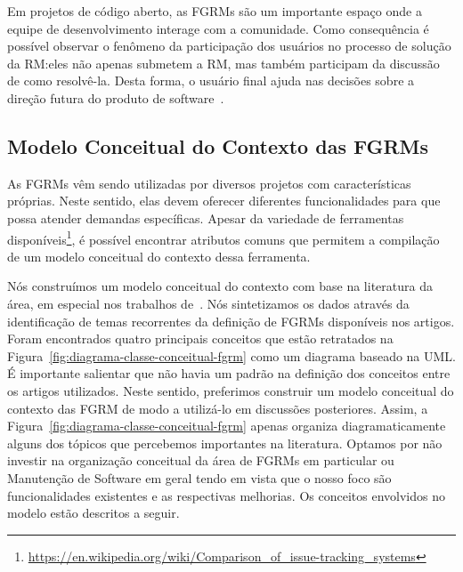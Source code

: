 Em projetos de código aberto, as FGRMs são um importante espaço onde a equipe de
desenvolvimento interage com a comunidade. Como consequência é possível observar
o fenômeno da participação dos usuários no processo de solução da RM:\@ eles não
apenas submetem a RM, mas também participam da discussão de como resolvê-la.
Desta forma, o usuário final ajuda nas decisões sobre a direção futura do
produto de software~\cite{breu2010information}.

\subsection{Modelo Conceitual do Contexto das FGRMs}
\label{sub:espectro_funcionalidades_fgrm}

As FGRMs vêm sendo utilizadas por diversos projetos com características
próprias. Neste sentido, elas devem oferecer diferentes funcionalidades para que
possa atender demandas específicas. Apesar da variedade de ferramentas
disponíveis\footnote{\url{https://en.wikipedia.org/wiki/Comparison_of_issue-tracking_systems}},
é possível encontrar atributos comuns que permitem a compilação de um modelo
conceitual do contexto dessa ferramenta.

Nós construímos um modelo conceitual do contexto com base na literatura da área,
em especial nos trabalhos de~\cite{cavalcanti2014challenges, singh2011bug,
    kshirsagar2015issue}. Nós sintetizamos os dados através da identificação de
temas recorrentes da definição de FGRMs disponíveis nos artigos. Foram
encontrados quatro principais conceitos que estão retratados na
Figura~\ref{fig:diagrama-classe-conceitual-fgrm} como um diagrama baseado na
UML\@. É importante salientar que não havia um padrão na definição dos conceitos
entre os artigos utilizados. Neste sentido, preferimos construir um modelo
conceitual do contexto das FGRM de modo a utilizá-lo em discussões posteriores.
Assim, a Figura~\ref{fig:diagrama-classe-conceitual-fgrm} apenas organiza
diagramaticamente alguns dos tópicos que percebemos importantes na literatura.
Optamos por não investir na organização conceitual da área de FGRMs em
particular ou Manutenção de Software em geral tendo em vista que o nosso foco
são funcionalidades existentes e as respectivas melhorias. Os conceitos
envolvidos no modelo estão descritos a seguir.

